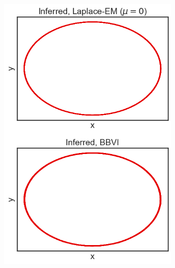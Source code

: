 \begin{figure}
\begin{subfigure}[b]{0.33\linewidth}
        \includegraphics[width=\linewidth]{./Figures/vdp-good-mu0.png}
        \caption{}
        \label{goodvdp:b}
        \vspace{4ex}
    \end{subfigure}%
    \begin{subfigure}[b]{0.33\linewidth}
        \centering

\end{subfigure}
\end{figure}
